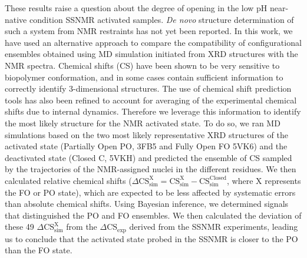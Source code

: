 \documentclass[%
 aip,
 amsmath,amssymb,
 preprint,%
]{revtex4-1}
\begin{document}
These results raise a question about the degree of opening in the low pH near-native condition SSNMR activated samples. \textit{De novo} structure determination of such a system from NMR restraints has not yet been reported. In this work, we have used an alternative approach to compare the compatibility of configurational ensembles obtained using MD simulation initiated from XRD structures with the NMR spectra. Chemical shifts (CS) have been shown to be very sensitive to biopolymer conformation, and in some cases contain sufficient information to correctly identify 3-dimensional structures.\cite{DeDios1993,Oldfield1995,Wishart2002,Niklasson2015} The use of chemical shift prediction tools has also been refined to account for averaging of the experimental chemical shifts due to internal dynamics.\cite{Robustelli2012,Li2012,Berjanskii2015} Therefore we leverage this information to identify the most likely structure for the NMR activated state. To do so, we ran MD simulations based on the two most likely representative XRD structures of the activated state (Partially Open PO, 3FB5 and Fully Open FO 5VK6) and the deactivated state (Closed C, 5VKH) and predicted the ensemble of CS sampled by the trajectories of the NMR-assigned nuclei in the different residues. We then calculated relative chemical shifts ($\Delta \text{CS}_\text{sim}^\text{X} = \text{CS}_\text{sim}^\text{X} - \text{CS}_\text{sim}^\text{Closed}$, where X represents the FO or PO state), which are expected to be less affected by systematic errors than absolute chemical shifts. Using Bayesian inference, we determined signals that distinguished the PO and FO ensembles. We then calculated the deviation of these 49 $\Delta \text{CS}_\text{sim}^\text{X}$ from the $\Delta \text{CS}_\text{exp}$ derived from the SSNMR experiments, leading us to conclude that the activated state probed in the SSNMR is closer to the PO than the FO state.
\end{document}
